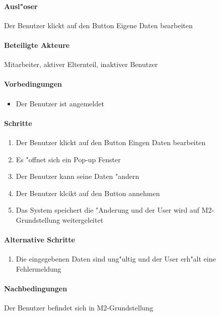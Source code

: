   \paragraph{Ausl"oser}
  Der Benutzer klickt auf den Button \dq Eigene Daten bearbeiten\dq
  \paragraph{Beteiligte Akteure}   \leavevmode \newline
    Mitarbeiter, aktiver Elternteil, inaktiver Benutzer
  \paragraph{Vorbedingungen}
  \begin{itemize}
   \item Der Benutzer ist angemeldet
  \end{itemize}

  \paragraph{Schritte}
  \begin{enumerate}
   \item Der Benutzer klickt auf den Button \dq Eingen Daten bearbeiten\dq
   \item Es "offnet sich ein Pop-up Fenster
   \item Der Benutzer kann seine Daten "andern
   \item Der Benutzer klcikt auf den Button \dq annehmen\dq
   \item Das System speichert die "Anderung und der User wird auf M2-Grundstellung weitergeleitet
  \end{enumerate}

  \paragraph{Alternative Schritte}
  \begin{enumerate}
   \item Die eingegebenen Daten sind ung"ultig und der User erh"alt eine Fehlermeldung
  \end{enumerate}

  \paragraph{Nachbedingungen}
  Der Benutzer befindet sich in M2-Grundstellung

